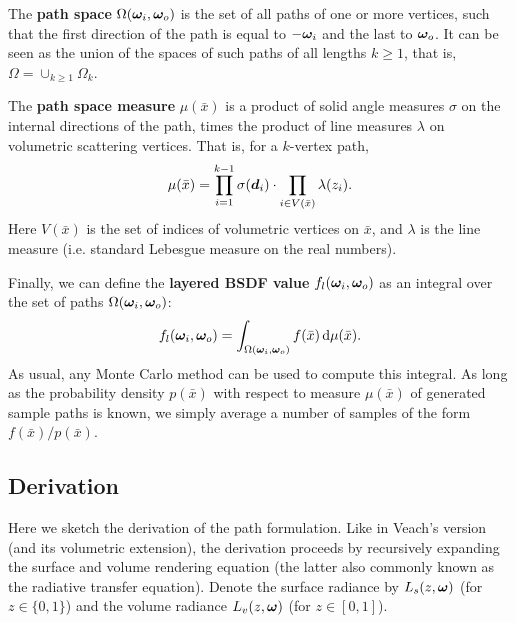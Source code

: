 The {\bf path space} $\Omega(\bm{\omega}_i, \bm{\omega}_o)$ is the set of all paths of one or more vertices, such that the first direction of the path is equal to $-\bm{\omega}_i$ and the last to $\bm{\omega}_o$. It can be seen as the union of the spaces of such paths of all lengths $k \geq 1$, that is, $\Omega = \cup_{k \geq 1} \Omega_k$.

The {\bf path space measure} $\mu(\bar x)$ is a product of solid angle measures $\sigma$ on the internal directions of the path, times the product of line measures $\lambda$ on volumetric scattering vertices.
That is, for a $k$-vertex path,
\begin{equation}
\mu(\bar x) = \prod_{i=1}^{k-1} \sigma(\bm{d}_i) \cdot \prod_{i \in V(\bar x)} \lambda(z_i).
\end{equation}
Here $V(\bar x)$ is the set of indices of volumetric vertices on $\bar x$, and $\lambda$ is the line measure (i.e. standard Lebesgue measure on the real numbers).

Finally, we can define the {\bf layered BSDF value} $f_l(\bm{\omega}_i, \bm{\omega}_o)$ as an integral over the set of paths $\Omega(\bm{\omega}_i, \bm{\omega}_o)$:
\begin{equation}
\label{eq:pathintegral}
	f_l(\bm{\omega}_i, \bm{\omega}_o) = \int_{\Omega(\bm{\omega}_i, \bm{\omega}_o)} f(\bar x) \,\mathrm{d} \mu(\bar x).
\end{equation}
As usual, any Monte Carlo method can be used to compute this integral. As long as the probability density $p(\bar x)$ with respect to measure $\mu(\bar x)$ of generated sample paths is known, we simply average a number of samples of the form $f(\bar x) / p(\bar x)$.


\subsection{Derivation}

Here we sketch the derivation of the path formulation.
Like in Veach's version (and its volumetric extension), the derivation proceeds by recursively expanding the surface and volume rendering equation (the latter also commonly known as the radiative transfer equation). Denote the surface radiance by $L_s(z, \bm{\omega})$ (for $z \in \{0, 1\}$) and the volume radiance $L_v(z, \bm{\omega})$ (for $z \in [0,1]$).

